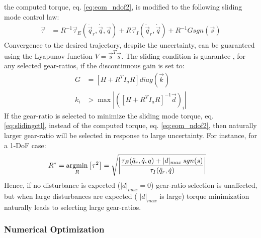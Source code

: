 the computed torque, eq. \eqref{eq:eom_ndof2}, is modified to the following sliding mode control law: 
\begin{align}
	\vec{\tau} &=  R^{-1} 
	\vec{\tau}_{E}(\ddot{\vec{q}}_r,\dot{\vec{q}},\vec{q}) 
	+ R 
	\vec{\tau}_{I}(\ddot{\vec{q}}_r,\dot{\vec{q}})
    + R^{-1} G sgn( \vec{s} ) 
 \label{eq:slidingctl}
\end{align}
Convergence to the desired trajectory, despite the uncertainty, can be guaranteed using the Lyapunov function $V=\vec{s}^T \vec{s}$. The sliding condition is guarantee \cite{asada_robot_1986}, for any selected gear-ratios, if the discontinuous gain is set to:
\begin{align}
	G &= \left[ H + R^T I_a R \right] diag( \vec{k} ) \\ k_{i} &> \max \left| \left(  \left[ H + R^T I_a R \right]^{-1} \vec{d} \right)_{i} \right|
 \label{eq:slidingcond}
\end{align}
%
If the gear-ratio is selected to minimize the sliding mode torque, eq. \eqref{eq:slidingctl}, instead of the computed torque, eq. \eqref{eq:eom_ndof2}, then naturally larger gear-ratio  will be selected in response to large uncertainty. For instance, for a 1-DoF case:
\begin{align}
	R^{*} &= \operatornamewithlimits{argmin}\limits_{R} \left[ \tau^2 \right] = \sqrt{ \left | \frac{\tau_{E}(\ddot{q}_r,\dot{q},q) + | d |_{max} \, sgn( s ) }{\tau_{I}(\ddot{q}_r,\dot{q})} \right |   } 
\label{eq:rstar_sliding}
\end{align}
Hence, if no disturbance is expected ($| d |_{max}=0$) gear-ratio selection is unaffected, but when large disturbances are expected ( $| d |_{max}$ is large) torque minimization naturally leads to selecting large gear-ratios.
%



\subsubsection{Numerical Optimization}

